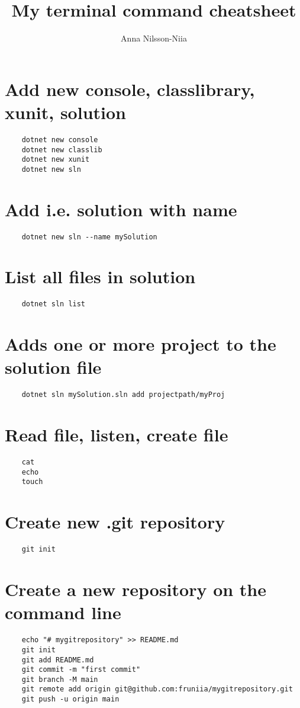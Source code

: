 \documentclass[10pt, a4paper]{article}
\title{My terminal command cheatsheet}
\author{Anna Nilsson-Niia}
\begin{document}
\maketitle
\section*{Add new console, classlibrary, xunit, solution}
\begin{verbatim}
    dotnet new console
    dotnet new classlib
    dotnet new xunit
    dotnet new sln
\end{verbatim}
\section*{Add i.e. solution with name}
\begin{verbatim}
    dotnet new sln --name mySolution
\end{verbatim}
\section*{List all files in solution}
\begin{verbatim}
    dotnet sln list
\end{verbatim}
\section*{Adds one or more project to the solution file}
\begin{verbatim}
    dotnet sln mySolution.sln add projectpath/myProj
\end{verbatim}
\section*{Read file, listen, create file}
\begin{verbatim}
    cat 
    echo 
    touch
\end{verbatim}
\section*{Create new .git repository}
\begin{verbatim}
    git init
\end{verbatim}
\section*{Create a new repository on the command line}
\begin{verbatim}
    echo "# mygitrepository" >> README.md
    git init
    git add README.md
    git commit -m "first commit"
    git branch -M main
    git remote add origin git@github.com:fruniia/mygitrepository.git
    git push -u origin main
\end{verbatim}
\end{document}
